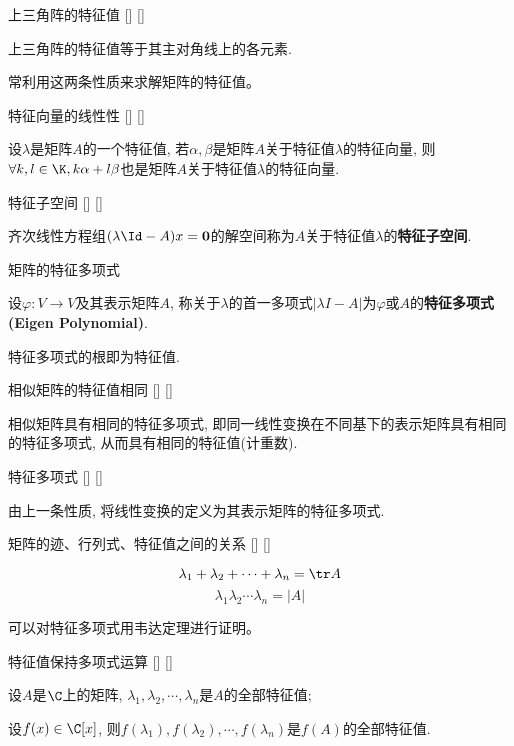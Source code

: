 \documentclass[UTF8]{ctexart}
\begin{document}
		\begin{ppt}
			[]
			{上三角阵的特征值}
			[]
			[]

			上三角阵的特征值等于其主对角线上的各元素. 
		\end{ppt}

		常利用这两条性质来求解矩阵的特征值。
		
		\begin{ppt}
			[]
			{特征向量的线性性}
			[]
			[]

			设$\lambda$是矩阵$A$的一个特征值, 若$\alpha,\beta$是矩阵$A$关于特征值$\lambda$的特征向量, 则$\forall k,l\in\K, k\alpha+l\beta$也是矩阵$A$关于特征值$\lambda$的特征向量. 
		\end{ppt}

		\begin{dfn}
			[]
			{特征子空间}
			[]
			[]

			齐次线性方程组$(\lambda\Id-A)x=\mathbf{0}$的解空间称为$A$关于特征值$\lambda$的\textbf{特征子空间}. 
		\end{dfn}

		\begin{dfn}
			{矩阵的特征多项式}
	
			设$\varphi: V\to V$及其表示矩阵$A$, 称关于$\lambda$的首一多项式$|\lambda I-A|$为$\varphi$或$A$的\textbf{特征多项式(Eigen Polynomial)}. 
	
			特征多项式的根即为特征值. 
		\end{dfn}
		
		\begin{ppt}
			[]
			{相似矩阵的特征值相同}
			[]
			[]

			相似矩阵具有相同的特征多项式, 即同一线性变换在不同基下的表示矩阵具有相同的特征多项式, 从而具有相同的特征值(计重数). 
		\end{ppt}
		
		\begin{dfn}
			[]
			{特征多项式}
			[]
			[]
			
			由上一条性质, 将线性变换的定义为其表示矩阵的特征多项式. 
		\end{dfn}
		
		\begin{ppt}
			[]
			{矩阵的迹、行列式、特征值之间的关系}
			[]
			[]

			\[\lambda_1+\lambda_2+\cdots+\lambda_n=\tr A\]
			\[\lambda_1\lambda_2\cdots\lambda_n=|A|\]
		\end{ppt}

		可以对特征多项式用韦达定理进行证明。
		
		\begin{ppt}
			[]
			{特征值保持多项式运算}
			[]
			[]

			设$A$是$\C$上的矩阵, $\lambda_1,\lambda_2,\cdots,\lambda_n$是$A$的全部特征值; 
			
			设$f(x)\in\C[x]$, 则$f(\lambda_1),f(\lambda_2),\cdots,f(\lambda_n)$是$f(A)$的全部特征值. 
		\end{ppt}
\end{document}
